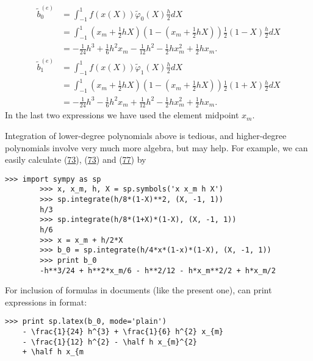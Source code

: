 \documentclass[../main.tex]{subfiles}
\begin{document}
	\begin{equation}\label{eqa77}
		\begin{aligned}
			\tilde{b}_{0}^{(e)} &=\int_{-1}^{1} f(x(X)) \tilde{\varphi}_{0}(X) \frac{h}{2} d X \\
			&=\int_{-1}^{1}\left(x_{m}+\frac{1}{2} h X\right)\left(1-\left(x_{m}+\frac{1}{2} h X\right)\right) \frac{1}{2}(1-X) \frac{h}{2} d X \\
			&=-\frac{1}{24} h^{3}+\frac{1}{6} h^{2} x_{m}-\frac{1}{12} h^{2}-\frac{1}{2} h x_{m}^{2}+\frac{1}{2} h x_{m}.
		\end{aligned}
	\end{equation}
	\begin{equation}\label{eqa78}
		\begin{aligned}
			\tilde{b}_{1}^{(e)} &=\int_{-1}^{1} f(x(X)) \tilde{\varphi}_{1}(X) \frac{h}{2} d X \\
			&=\int_{-1}^{1}\left(x_{m}+\frac{1}{2} h X\right)\left(1-\left(x_{m}+\frac{1}{2} h X\right)\right) \frac{1}{2}(1+X) \frac{h}{2} d X \\
			&=-\frac{1}{24} h^{3}-\frac{1}{6} h^{2} x_{m}+\frac{1}{12} h^{2}-\frac{1}{2} h x_{m}^{2}+\frac{1}{2} h x_{m}.
		\end{aligned}
	\end{equation}
	In the last two expressions we have used the element midpoint $x_{m}$.
	
	Integration of lower-degree polynomials above is tedious, and higher-degree polynomials involve very much more algebra, but  may help. For example, we can easily calculate (\hyperref[eqa73]{73}), (\hyperref[eqa73]{73}) and (\hyperref[eqa77]{77}) by
	\begin{lstlisting}[numbers=none]
		>>> import sympy as sp
		>>> x, x_m, h, X = sp.symbols('x x_m h X')
		>>> sp.integrate(h/8*(1-X)**2, (X, -1, 1))
		h/3
		>>> sp.integrate(h/8*(1+X)*(1-X), (X, -1, 1))
		h/6
		>>> x = x_m + h/2*X
		>>> b_0 = sp.integrate(h/4*x*(1-x)*(1-X), (X, -1, 1))
		>>> print b_0
		-h**3/24 + h**2*x_m/6 - h**2/12 - h*x_m**2/2 + h*x_m/2	
	\end{lstlisting}
	For inclusion of formulas in documents (like the present one),  can print
	expressions in  format:
	\begin{lstlisting}[numbers=none]
	>>> print sp.latex(b_0, mode='plain')
	- \frac{1}{24} h^{3} + \frac{1}{6} h^{2} x_{m}
	- \frac{1}{12} h^{2} - \half h x_{m}^{2}
	+ \half h x_{m
	\end{lstlisting}
\clearpage
\end{document}

